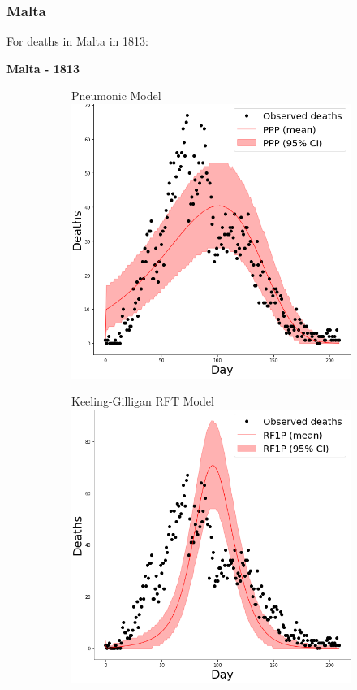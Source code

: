 \documentclass [letterpaper, 12pt] {article}
\begin{document}
\newpage

\subsubsection{Malta}
For deaths in Malta in 1813:

\begin{center}
	\textbf{Malta - 1813}
\end{center}
\begin{figure}[H]
	\begin{subfigure}{0.5\textwidth}
		\centering
		Pneumonic Model
		\includegraphics[width=\linewidth]{pneum/malta}
	\end{subfigure}\hspace{\fill}
	\begin{subfigure}{0.5\textwidth}
		\centering
		Keeling-Gilligan RFT Model
		\includegraphics[width=\linewidth]{rats1/malta}

\end{subfigure}
\end{figure}
\end{document}
